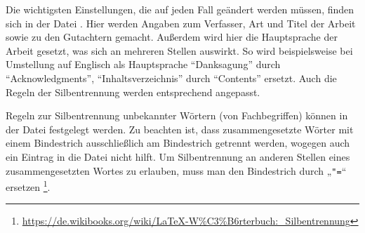 Die wichtigsten Einstellungen, die auf jeden Fall geändert werden müssen,
finden sich in der Datei .
Hier werden \ua Angaben zum Verfasser, Art und Titel der Arbeit sowie zu den Gutachtern gemacht.
Außerdem wird hier die Hauptsprache der Arbeit gesetzt, was sich an mehreren Stellen auswirkt.
So wird beispielsweise bei Umstellung auf Englisch als Hauptsprache
\enquote{Danksagung} durch \enquote{Acknowledgments},
\enquote{Inhaltsverzeichnis} durch \enquote{Contents}
\usw ersetzt.
Auch die Regeln der Silbentrennung werden entsprechend angepasst.

Regeln zur Silbentrennung unbekannter Wörtern (\zB von Fachbegriffen)
können in der Datei  festgelegt werden.
Zu beachten ist, dass zusammengesetzte Wörter mit einem Bindestrich
ausschließlich am Bindestrich getrennt werden,
wogegen auch ein Eintrag in die Datei  nicht hilft.
Um Silbentrennung an anderen Stellen eines zusammengesetzten Wortes zu erlauben,
muss man den Bindestrich durch „\verb+"=+“ ersetzen%
\footnote{\url{https://de.wikibooks.org/wiki/LaTeX-W%C3%B6rterbuch:_Silbentrennung}}.
